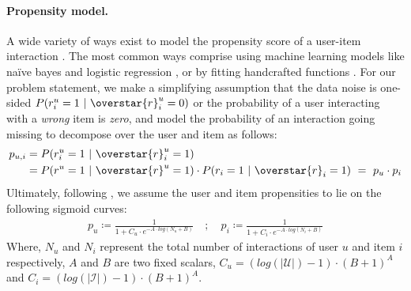 \paragraph{Propensity model.} A wide variety of ways exist 
to model the propensity score of a user-item interaction \cite{propensity_1, rec_as_treatments, sachdeva_kdd20, pfastre}. The most common ways comprise using machine learning models like na\"ive bayes and logistic regression \cite{rec_as_treatments}, or by fitting handcrafted functions \cite{pfastre}. For our problem statement, we make a simplifying assumption that the data noise is one-sided \ie $P(r^u_i = 1 ~|~ \overstar{r}^u_i = 0)$ or the probability of a user interacting with a \emph{wrong} item is \emph{zero}, and model the probability of an interaction going missing to decompose over the user and item as follows:
\begin{align*}
    p_{u, i} &= P(r^u_i = 1 ~|~ \overstar{r}^u_i = 1) \\
    &= P(r^u = 1 ~|~ \overstar{r}^u = 1) \cdot P(r_i = 1 ~|~ \overstar{r}_i = 1) ~=~ p_u \cdot p_i
\end{align*}
Ultimately, following \cite{pfastre}, we assume the user and item propensities to lie on the following sigmoid curves:
\begin{equation*}
\begin{split}
    p_u \coloneqq \frac{1}{1 + C_u \cdot e^{-A \cdot log(N_u + B)}} \quad ; \quad p_i \coloneqq \frac{1}{1 + C_i \cdot e^{-A \cdot log(N_i + B)}}
\end{split}
\end{equation*}
Where, $N_u$ and $N_i$ represent the total number of interactions of user $u$ and item $i$ respectively, $A$ and $B$ are two fixed scalars, $C_u = (log(|\mathcal{U}|) - 1) \cdot (B+1)^A$ and $C_i = (log(|\mathcal{I}|) - 1) \cdot (B+1)^A$. 

